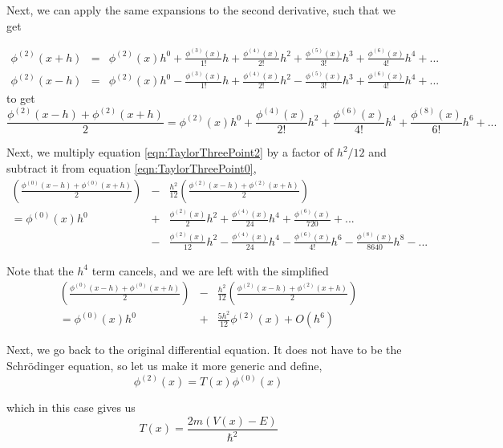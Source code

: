 \documentclass[preprint]{revtex4}
\newcommand{\phid}[1]{\ensuremath{\phi^{(#1)}}}
\begin{document}
Next, we can apply the same expansions to the second derivative, such that we get

\begin{eqnarray}
    \phid{2}(x+h) &=& \phid{2}(x)h^0 + \frac{\phid{3}(x)}{1!}h + \frac{\phid{4}(x)}{2!}h^2 + \frac{\phid{5}(x)}{3!}h^3 + \frac{\phid{6}(x)}{4!}h^4 + ... \nonumber \\
    \phid{2}(x-h) &=& \phid{2}(x)h^0 - \frac{\phid{3}(x)}{1!}h + \frac{\phid{4}(x)}{2!}h^2 - \frac{\phid{5}(x)}{3!}h^3 + \frac{\phid{6}(x)}{4!}h^4 + ... \nonumber 
\end{eqnarray}
to get
\begin{equation}
\label{eqn:TaylorThreePoint2}
    \frac{\phid{2}(x-h) + \phid{2}(x+h)}{2} = \phid{2}(x)h^0 + \frac{\phid{4}(x)}{2!}h^2 + \frac{\phid{6}(x)}{4!}h^4 +  \frac{\phid{8}(x)}{6!}h^6 + ...
\end{equation}

Next, we multiply equation \ref{eqn:TaylorThreePoint2} by a factor of $h^2/12$ and subtract it from equation \ref{eqn:TaylorThreePoint0}, 
\begin{eqnarray}
    \left(\frac{\phid{0}(x-h) + \phid{0}(x+h)}{2}\right)  &-& \frac{h^2}{12}\left(\frac{\phid{2}(x-h) + \phid{2}(x+h)}{2}\right)  \nonumber \\
    = \phid{0}(x)h^0 &+& \frac{\phid{2}(x)}{2}h^2 + \frac{\phid{4}(x)}{24}h^4 +  \frac{\phid{6}(x)}{720} + ... \nonumber \\
    &-& \frac{\phid{2}(x)}{12}h^2 - \frac{\phid{4}(x)}{24}h^4 - \frac{\phid{6}(x)}{4!}h^6 -  \frac{\phid{8}(x)}{8640}h^8 - ...
\end{eqnarray}

Note that the $h^4$ term cancels, and we are left with the simplified
\begin{eqnarray}
    \left(\frac{\phid{0}(x-h) + \phid{0}(x+h)}{2}\right)  &-& \frac{h^2}{12}\left(\frac{\phid{2}(x-h) + \phid{2}(x+h)}{2}\right)  \nonumber \\
    = \phid{0}(x)h^0 &+& \frac{5h^2}{12}\phid{2}(x) + O(h^6) 
    \label{eqn:NumReduct}
\end{eqnarray}

Next, we go back to the original differential equation. It does not have to be the Schr\"odinger equation, so let us make it more generic and define, 
\begin{equation}
    \label{eqn:Tdifeq}
    \phid{2}(x) = T(x)\phid{0}(x)
\end{equation}

which in this case gives us
\begin{equation}
    \label{eqn:Tdef}
    T(x) = \frac{2m(V(x)-E)}{\hbar^2}
\end{equation}
\end{document}
